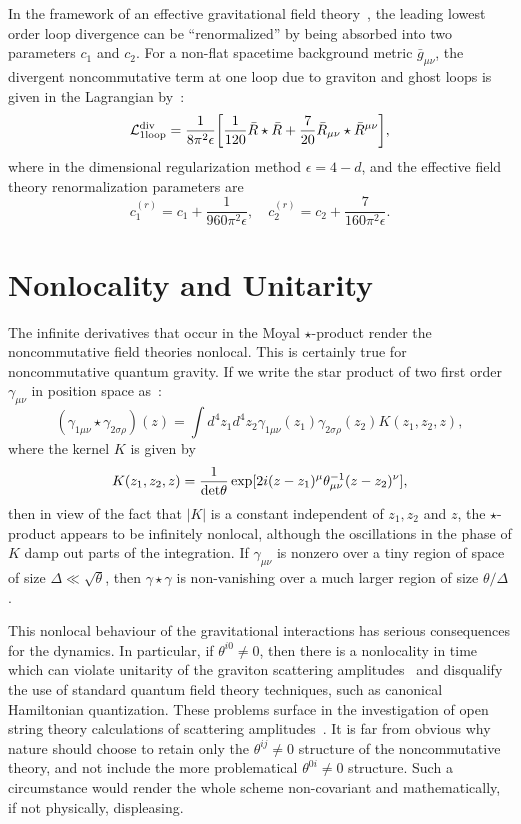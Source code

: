 \documentclass[a4paper,10pt]{article}
\begin{document}
In the framework of an effective gravitational field
theory~\cite{Donoghue}, the leading lowest order loop divergence can be
``renormalized'' by being absorbed into two parameters $c_1$ and $c_2$. For
a non-flat spacetime background metric ${\bar g}_{\mu\nu}$, the divergent
noncommutative term at one loop due to graviton and ghost loops is given in the
Lagrangian by~\cite{Veltman}:
\begin{equation}
{\cal L}^{\rm div}_{1{\rm
loop}}=\frac{1}{8\pi^2\epsilon} \biggl[\frac{1}{120}{\bar R}\star{\bar
R}+\frac{7}{20}{\bar R}_{\mu\nu} \star{\bar R}^{\mu\nu}\biggr], \end{equation} where
in the dimensional regularization method $\epsilon=4-d$, and the effective 
field theory renormalization parameters are
\begin{equation}
c^{(r)}_1=c_1+\frac{1}{960\pi^2\epsilon},\quad
c^{(r)}_2=c_2+\frac{7}{160\pi^2\epsilon}.
\end{equation}
 
\section{Nonlocality and Unitarity}

The infinite derivatives that occur in the Moyal $\star$-product render the
noncommutative field theories nonlocal. This is certainly true for
noncommutative quantum gravity. If we write the star product of two first
order $\gamma_{\mu\nu}$ in position space as~\cite{Minwalla}:
\begin{equation}
(\gamma_{1\mu\nu}\star\gamma_{2\sigma\rho})(z)=
\int d^4z_1d^4z_2\gamma_{1\mu\nu}(z_1)\gamma_{2\sigma\rho}(z_2)K(z_1,z_2,z),
\end{equation}
where the kernel $K$ is given by
\begin{equation}
K(z_1,z_2,z)=\frac{1}{{\rm
det\theta}}\exp[2i(z-z_1)^\mu\theta_{\mu\nu}^{-1}(z-z_2)^\nu],
\end{equation}
then in view of the fact that $\vert K\vert$ is a constant independent of
$z_1,z_2$ and $z$, the $\star$-product appears to be infinitely
nonlocal, although the oscillations in the phase of $K$ damp out parts of
the integration. If $\gamma_{\mu\nu}$ is nonzero over a tiny region of
space of size $\Delta \ll \sqrt{\theta}$, then $\gamma\star\gamma$ is
non-vanishing over a much larger region of size $\theta/\Delta$.

This nonlocal behaviour of the gravitational interactions has serious
consequences for the dynamics. In particular, if $\theta^{i0}\not=0$, then
there is a nonlocality in time which can violate unitarity of the graviton
scattering amplitudes~\cite{Gomis} and disqualify the use of standard
quantum field theory techniques, such as canonical Hamiltonian
quantization. These problems surface in the investigation of open
string theory calculations of scattering
amplitudes~\cite{Seiberg,Seiberg2}. It is far from obvious why nature
should choose to retain only the $\theta^{ij}\not=0$ structure of the
noncommutative theory, and not include the more problematical
$\theta^{0i}\not=0$ structure. Such a circumstance would render the whole
scheme non-covariant and mathematically, if not physically, displeasing.
\end{document}
